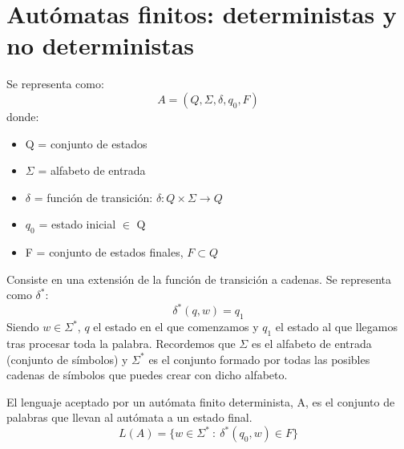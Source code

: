\documentclass{apuntes}
\begin{document}
\newpage

\chapter{Autómatas finitos: deterministas y no deterministas}
\begin{defn}
Se representa como:
\[ A=(Q, \Sigma, \delta, q_0, F)\]
 donde:
\begin{itemize}
\item Q = conjunto de estados
\item $\Sigma$ =  alfabeto de entrada
\item $\delta$ = función de transición: $\delta : Q\times \Sigma \rightarrow Q$
\item $q_0$ = estado inicial $\in$ Q
\item F = conjunto de estados finales, $F \subset Q$
\end{itemize}
\end{defn}


\begin{defn}
Consiste en una extensión de la función de transición a cadenas. Se representa como $\delta ^*$:
\[\delta^*(q, w)=q_1\]
Siendo $w\in \Sigma ^*$, $q$ el estado en el que comenzamos y $q_1$ el estado al que llegamos tras procesar toda la palabra. Recordemos que $\Sigma$ es el alfabeto de entrada (conjunto de símbolos) y $\Sigma^*$ es el conjunto formado por todas las posibles cadenas de símbolos que puedes crear con dicho alfabeto.
\end{defn}

\begin{defn}
El lenguaje aceptado por un autómata finito determinista, A, es el conjunto de palabras que llevan al autómata a un estado final.
\[L(A) = \lbrace w \in \Sigma^* \ : \ \delta^*(q_0, w) \in F \rbrace\]
\end{defn}
\end{document}
